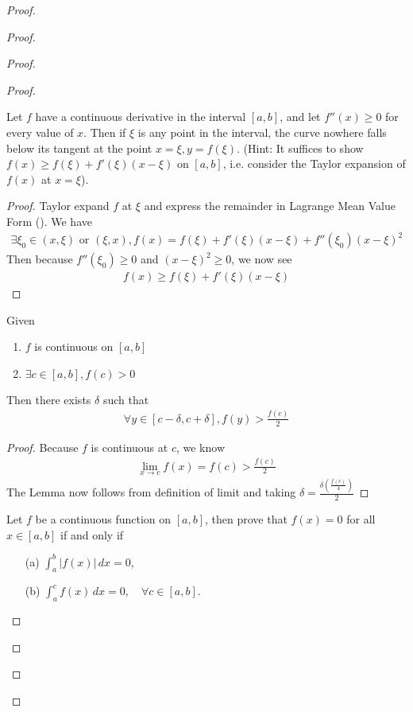 \documentclass{report}
\begin{document}
\begin{proof}
\begin{proof}
\begin{proof}
\begin{proof}
\begin{question}{}{}
Let \( f \) have a continuous derivative in the interval \( [a,b] \), and let \( f''(x) \geq 0 \) for every value of \( x \). Then if \( \xi \) is any point in the interval, the curve nowhere falls below its tangent at the point \( x = \xi, y = f(\xi) \). (Hint: It suffices to show \( f(x) \geq f(\xi) + f'(\xi)(x - \xi) \) on \( [a,b] \), i.e. consider the Taylor expansion of \( f(x) \) at \( x = \xi \)).
\end{question}
\begin{proof}
Taylor expand $f$ at $\xi$ and express the remainder in Lagrange Mean Value Form (). We have 
\begin{align*}
\exists \xi_0\in (x,\xi)\text{ or }(\xi,x), f(x)=f(\xi)+f'(\xi)(x-\xi)+f''(\xi_0)(x-\xi)^2
\end{align*}
Then because $f''(\xi_0)\geq 0$ and $(x-\xi)^2\geq 0$, we now see 
\begin{align*}
f(x)\geq f(\xi)+f'(\xi)(x-\xi)
\end{align*}
\end{proof}
\begin{lemma}
\label{11.7.1}
Given 
\begin{enumerate}[label=(\alph*)]
  \item $f$ is continuous on $[a,b]$ 
  \item $\exists c\in [a,b], f(c)>0$ 
\end{enumerate}
Then there exists $\delta $ such that 
\begin{align*}
\forall y \in [c-\delta ,c+\delta ], f(y)>\frac{f(c)}{2}
\end{align*}
\end{lemma}
\begin{proof}
Because $f$ is continuous at $c$,  we know 
\begin{align*}
\lim_{x \to c} f(x)=f(c)>\frac{f(c)}{2}
\end{align*}
The Lemma now follows from definition of limit and taking $\delta=\frac{\delta (\frac{f(c)}{4})}{2}$
\end{proof}
\begin{question}{}{}
Let \( f \) be a continuous function on \( [a, b] \), then prove that \( f(x) = 0 \) for all \( x \in [a, b] \) if and only if 
\begin{enumerate}
\item[(a)] \(\int_{a}^{b} |f(x)| \, dx = 0\),
\item[(b)] \(\int_{a}^{c} f(x) \, dx = 0, \quad \forall c \in [a, b]\).
\end{enumerate}

\end{question}
\end{proof}
\end{proof}
\end{proof}
\end{proof}
\end{document}

